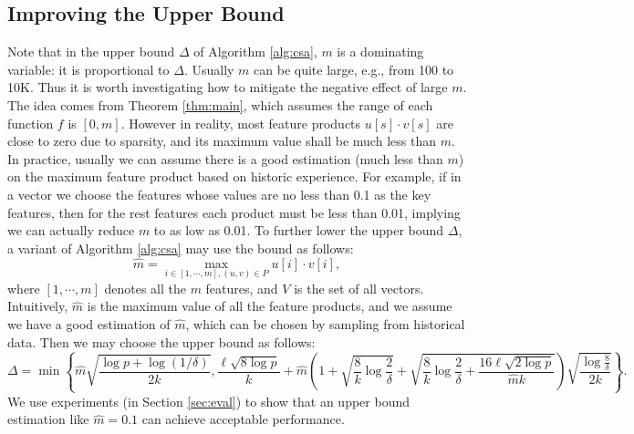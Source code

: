 \documentclass{article}
\begin{document}
\subsection{Improving the Upper Bound}
\label{sec:imprb}
Note that in the upper bound $\Delta$ of Algorithm \ref{alg:csa}, $m$ is a dominating variable: it is proportional to $\Delta$. Usually $m$ can be quite large, e.g., from 100 to 10K. Thus it is worth investigating how to mitigate the negative effect of large $m$. The idea comes from Theorem \ref{thm:main}, which assumes the range of each function $f$ is $[0,m]$. However in reality, most feature products $u[s]\cdot v[s]$ are close to zero due to sparsity, and its maximum value shall be much less than $m$. In practice, usually we can assume there is a good estimation (much less than $m$) on the maximum feature product based on historic experience. For example, if in a vector we choose the features whose values are no less than 0.1 as the key features, then for the rest features each product must be less than 0.01, implying we can actually reduce $m$ to as low as 0.01. To further lower the upper bound $\Delta$, a variant of Algorithm \ref{alg:csa} may use the bound as follows:
$$\hat{m} = \max_{i\in [1,\cdots,m], (u,v) \in P}u[i]\cdot v[i],$$
where $[1,\cdots,m]$ denotes all the $m$ features, and $V$ is the set of all vectors. Intuitively, $\hat{m}$ is the maximum value of all the feature products, and we assume we have a good estimation of $\hat{m}$, which can be chosen by sampling from historical data. 
Then we may choose the upper bound as follows:
$$\Delta = \min\left\{\hat{m}\sqrt{\frac{\log p + \log(1/\delta)}{2k}}, \frac{\ell\sqrt{8\log p}}{k} +\hat{m}\left(1+\sqrt{\frac{8}{k}\log \frac{2}{\delta}} + \sqrt{\frac{8}{k}\log \frac{2}{\delta} + \frac{16\ell\sqrt{2\log p}}{\hat{m}k}}\right)\sqrt{\frac{\log \frac{8}{\delta}}{2k}}\right\}.$$
We use experiments (in Section \ref{sec:eval}) to show that an upper bound estimation like $\hat{m} = 0.1$ can achieve acceptable performance.
\end{document}
